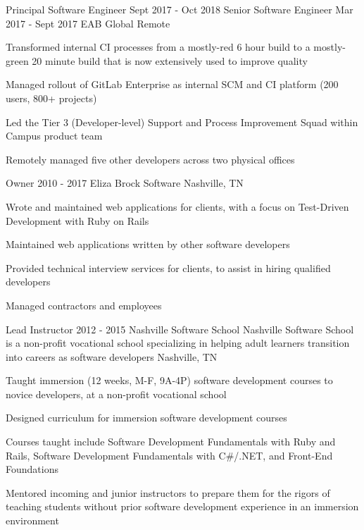 \begin{cventries}
  \doublecventry
  {Principal Software Engineer}
  {Sept 2017 - Oct 2018}
  {Senior Software Engineer}
  {Mar 2017 - Sept 2017}
  {EAB Global}
  {Remote}
  {
    \begin{cvitems}
      \item Transformed internal CI processes from a mostly-red 6 hour build to a mostly-green 20 minute build that is now extensively used to improve quality
      \item Managed rollout of GitLab Enterprise as internal SCM and CI platform (200 users, 800+ projects)
      \item Led the Tier 3 (Developer-level) Support and Process Improvement Squad within Campus product team
      \item Remotely managed five other developers across two physical offices
    \end{cvitems}
  }

  \cventry
  {Owner}
  {2010 - 2017}
  {Eliza Brock Software}
  {Nashville, TN}
  {
    \begin{cvitems}
      \item Wrote and maintained web applications for clients, with a focus on Test-Driven \mbox{Development} with Ruby on Rails
      \item Maintained web applications written by other software developers
      \item Provided technical interview services for clients, to assist in hiring qualified developers
      \item Managed contractors and employees
    \end{cvitems}
  }

  \cventrywithorganizationnote
  {Lead Instructor}
  {2012 - 2015}
  {Nashville Software School}
  {Nashville Software School is a non-profit vocational school specializing in helping adult learners transition into careers as software developers}
  {Nashville, TN}
  {
    \begin{cvitems}
      \item Taught immersion (12 weeks, M-F, 9A-4P) software development courses to novice developers, at a non-profit vocational school
      \item Designed curriculum for immersion software development courses
      \item Courses taught include Software Development Fundamentals with Ruby and Rails, Software Development Fundamentals with C\#/.NET, and Front-End Foundations
      \item Mentored incoming and junior instructors to prepare them for the rigors of teaching students without prior software development experience in an immersion environment
    \end{cvitems}
  }

\end{cventries}

